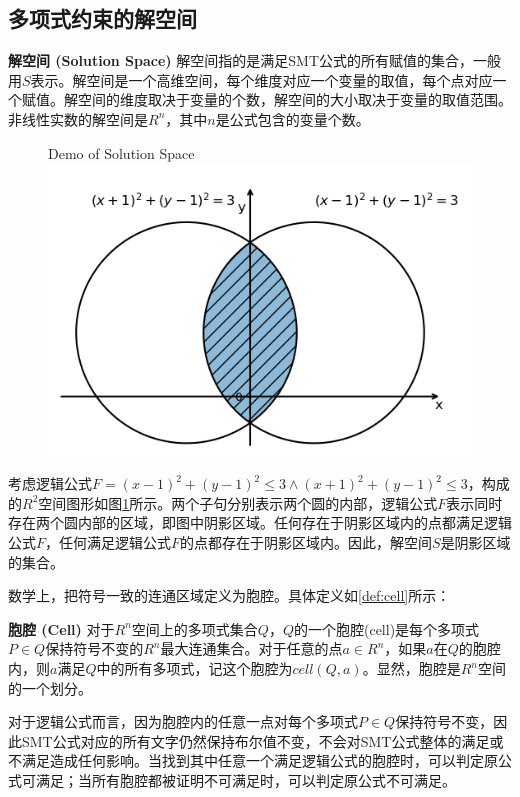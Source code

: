 \subsection{多项式约束的解空间}
\begin{definition}{\textbf{解空间 (Solution Space)}}
解空间指的是满足SMT公式的所有赋值的集合，一般用$S$表示。解空间是一个高维空间，每个维度对应一个变量的取值，每个点对应一个赋值。解空间的维度取决于变量的个数，解空间的大小取决于变量的取值范围。非线性实数的解空间是$R^n$，其中$n$是公式包含的变量个数。
\end{definition}
\begin{example}
    \begin{figure}[]
        \centering
         {Demo of Solution Space}
        \includegraphics[width=0.4\columnwidth]{Img/cell1.png}
        \label{fig:solution_space}
    \end{figure}
    
    考虑逻辑公式$F = (x - 1)^2 + (y - 1)^2 \le 3 \wedge (x + 1)^2 + (y - 1)^2 \le 3$，构成的$R^2$空间图形如图\ref{fig:solution_space}所示。两个子句分别表示两个圆的内部，逻辑公式$F$表示同时存在两个圆内部的区域，即图中阴影区域。任何存在于阴影区域内的点都满足逻辑公式$F$，任何满足逻辑公式$F$的点都存在于阴影区域内。因此，解空间$S$是阴影区域的集合。
\label{ex:solution_space}
\end{example}
    
数学上，把符号一致的连通区域定义为胞腔。具体定义如\ref{def:cell}所示：

\begin{definition}{\textbf{胞腔 (Cell)}}
对于$R^n$空间上的多项式集合$Q$，$Q$的一个胞腔(cell)是每个多项式$P \in Q$保持符号不变的$R^n$最大连通集合。对于任意的点$a \in R^n$，如果$a$在$Q$的胞腔内，则$a$满足$Q$中的所有多项式，记这个胞腔为$cell(Q, a)$。显然，胞腔是$R^n$空间的一个划分。
\label{def:cell}
\end{definition}

对于逻辑公式而言，因为胞腔内的任意一点对每个多项式$P \in Q$保持符号不变，因此SMT公式对应的所有文字仍然保持布尔值不变，不会对SMT公式整体的满足或不满足造成任何影响。当找到其中任意一个满足逻辑公式的胞腔时，可以判定原公式可满足；当所有胞腔都被证明不可满足时，可以判定原公式不可满足。

